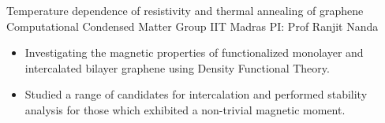 
        {Temperature dependence of resistivity and thermal annealing of graphene}
        {Computational Condensed Matter Group}
        {IIT Madras}
        {PI: Prof Ranjit Nanda}{
    \begin{itemize}
        \item Investigating the magnetic properties of functionalized monolayer and intercalated bilayer graphene using Density Functional Theory.
        \item Studied a range of candidates for intercalation and performed stability analysis for those which exhibited a non-trivial magnetic moment. 
    \end{itemize}
}
